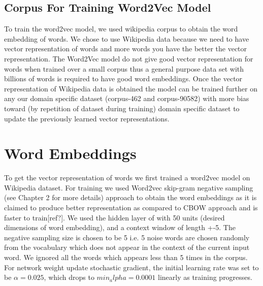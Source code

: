 \subsection{Corpus For Training Word2Vec Model}

To train the word2vec model, we used wikipedia corpus to obtain the word embedding of words.
 We chose to use Wikipedia data because we need to have vector representation of words and more words you have the better the vector representation. The Word2Vec model do not give good vector representation for words when trained over a small corpus thus a general purpose data set with billions of words is required to have good word embeddings. Once the vector representation of Wikipedia data is obtained the model can be trained further on any our domain specific dataset (corpus-462 and corpus-90582) with more bias toward (by repetition of dataset during training) domain specific dataset to update the previously learned vector representations. 

\section{Word Embeddings}

To get the vector representation of words we first trained a word2vec model on Wikipedia dataset. For training we used Word2vec skip-gram negative sampling (see Chapter 2 for more details) approach to obtain the word embeddings as it is claimed to produce better representation as compared to CBOW approach and is faster to train[ref?]. We used the hidden layer of with 50 units (desired dimensions of word embedding), and  a context window of length +-5. The negative sampling size is chosen to be 5 i.e. 5 noise words are chosen randomly from the vocabulary which does not appear in the context of the current input word. We ignored all the words which appears less than 5 times in the corpus. For network weight update stochastic gradient, the initial learning rate was set to be $\alpha=0.025$, which drops to $min_alpha=0.0001$ linearly as training progresses. 

